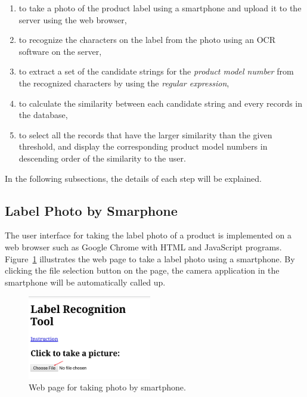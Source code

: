 \documentclass[technicalreport]{ieicej}
\begin{document}
        \begin{enumerate}
            \item to take a photo of the product label using a smartphone and upload it to the server using the web browser,
            \item to recognize the characters on the label from the photo using an OCR software on the server,
            \item to extract a set of the candidate strings for the {\em product model number} from the recognized characters by using the {\em regular expression}, 
            \item to calculate the similarity between each candidate string and every records in the database,
            \item to select all the records that have the larger similarity than the given threshold, and display the corresponding product model numbers in descending order of the similarity to the user. 
        \end{enumerate}

        In the following subsections, the details of each step will be explained.

    \subsection{Label Photo by Smarphone}
    \label{sec:label-requirement}
        The user interface for taking the label photo of a product is implemented on a web browser such as Google Chrome with HTML and JavaScript programs. Figure~\ref{fig:homepage} illustrates the web page to take a label photo using a smartphone. By clicking the file selection button on the page, the camera application in the smartphone will be automatically called up.

        \begin{figure}[t] 
            \begin{center}
            \includegraphics[width=0.48\textwidth]{figure/homepage.png}
            \end{center}
            \caption{Web page for taking photo by smartphone.}
            \label{fig:homepage}
        \end{figure}
\end{document}
